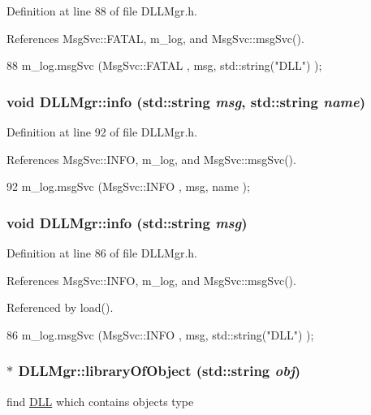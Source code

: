 Definition at line 88 of file DLLMgr.h.

References MsgSvc::FATAL, m\_\-log, and MsgSvc::msgSvc().


\begin{DoxyCode}
88 { m_log.msgSvc (MsgSvc::FATAL   , msg, std::string("DLL") ); }
\end{DoxyCode}
\hypertarget{classDLLMgr_ac6468f1f9079b683ce5fe60e1d697dda}{
\subsubsection[{info}]{\setlength{\rightskip}{0pt plus 5cm}void DLLMgr::info (std::string {\em msg}, \/  std::string {\em name})}}
\label{classDLLMgr_ac6468f1f9079b683ce5fe60e1d697dda}


Definition at line 92 of file DLLMgr.h.

References MsgSvc::INFO, m\_\-log, and MsgSvc::msgSvc().


\begin{DoxyCode}
92 { m_log.msgSvc (MsgSvc::INFO    , msg, name ); }
\end{DoxyCode}
\hypertarget{classDLLMgr_a14b8e15b87602027c0a11f91173bebed}{
\subsubsection[{info}]{\setlength{\rightskip}{0pt plus 5cm}void DLLMgr::info (std::string {\em msg})}}
\label{classDLLMgr_a14b8e15b87602027c0a11f91173bebed}


Definition at line 86 of file DLLMgr.h.

References MsgSvc::INFO, m\_\-log, and MsgSvc::msgSvc().

Referenced by load().


\begin{DoxyCode}
86 { m_log.msgSvc (MsgSvc::INFO    , msg, std::string("DLL") ); }
\end{DoxyCode}
\hypertarget{classDLLMgr_a7e8c992899b7357158aef047a2f15c51}{
\subsubsection[{libraryOfObject}]{ $\ast$ DLLMgr::libraryOfObject (std::string {\em obj})}}
\label{classDLLMgr_a7e8c992899b7357158aef047a2f15c51}
find \hyperlink{classDLL}{DLL} which contains objects type 

